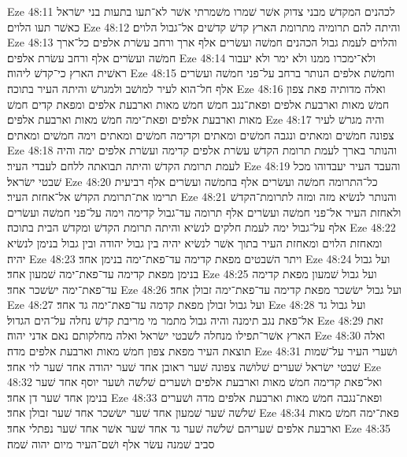 Eze 48:11  לכהנים המקדשׁ מבני צדוק אשׁר שׁמרו משׁמרתי אשׁר לא־תעו בתעות בני ישׂראל כאשׁר תעו הלוים׃
Eze 48:12  והיתה להם תרומיה מתרומת הארץ קדשׁ קדשׁים אל־גבול הלוים׃
Eze 48:13  והלוים לעמת גבול הכהנים חמשׁה ועשׂרים אלף ארך ורחב עשׂרת אלפים כל־ארך חמשׁה ועשׂרים אלף ורחב עשׂרת אלפים׃
Eze 48:14  ולא־ימכרו ממנו ולא ימר ולא יעבור ראשׁית הארץ כי־קדשׁ ליהוה׃
Eze 48:15  וחמשׁת אלפים הנותר ברחב על־פני חמשׁה ועשׂרים אלף חל־הוא לעיר למושׁב ולמגרשׁ והיתה העיר בתוכה׃
Eze 48:16  ואלה מדותיה פאת צפון חמשׁ מאות וארבעת אלפים ופאת־נגב חמשׁ חמשׁ מאות וארבעת אלפים ומפאת קדים חמשׁ מאות וארבעת אלפים ופאת־ימה חמשׁ מאות וארבעת אלפים׃
Eze 48:17  והיה מגרשׁ לעיר צפונה חמשׁים ומאתים ונגבה חמשׁים ומאתים וקדימה חמשׁים ומאתים וימה חמשׁים ומאתים׃
Eze 48:18  והנותר בארך לעמת תרומת הקדשׁ עשׂרת אלפים קדימה ועשׂרת אלפים ימה והיה לעמת תרומת הקדשׁ והיתה תבואתה ללחם לעבדי העיר׃
Eze 48:19  והעבד העיר יעבדוהו מכל שׁבטי ישׂראל׃
Eze 48:20  כל־התרומה חמשׁה ועשׂרים אלף בחמשׁה ועשׂרים אלף רביעית תרימו את־תרומת הקדשׁ אל־אחזת העיר׃
Eze 48:21  והנותר לנשׂיא מזה ומזה לתרומת־הקדשׁ ולאחזת העיר אל־פני חמשׁה ועשׂרים אלף תרומה עד־גבול קדימה וימה על־פני חמשׁה ועשׂרים אלף על־גבול ימה לעמת חלקים לנשׂיא והיתה תרומת הקדשׁ ומקדשׁ הבית בתוכה׃
Eze 48:22  ומאחזת הלוים ומאחזת העיר בתוך אשׁר לנשׂיא יהיה בין גבול יהודה ובין גבול בנימן לנשׂיא יהיה׃
Eze 48:23  ויתר השׁבטים מפאת קדימה עד־פאת־ימה בנימן אחד׃
Eze 48:24  ועל גבול בנימן מפאת קדימה עד־פאת־ימה שׁמעון אחד׃
Eze 48:25  ועל גבול שׁמעון מפאת קדימה עד־פאת־ימה ישׂשכר אחד׃
Eze 48:26  ועל גבול ישׂשכר מפאת קדימה עד־פאת־ימה זבולן אחד׃
Eze 48:27  ועל גבול זבולן מפאת קדמה עד־פאת־ימה גד אחד׃
Eze 48:28  ועל גבול גד אל־פאת נגב תימנה והיה גבול מתמר מי מריבת קדשׁ נחלה על־הים הגדול׃
Eze 48:29  זאת הארץ אשׁר־תפילו מנחלה לשׁבטי ישׂראל ואלה מחלקותם נאם אדני יהוה׃
Eze 48:30  ואלה תוצאת העיר מפאת צפון חמשׁ מאות וארבעת אלפים מדה׃
Eze 48:31  ושׁערי העיר על־שׁמות שׁבטי ישׂראל שׁערים שׁלושׁה צפונה שׁער ראובן אחד שׁער יהודה אחד שׁער לוי אחד׃
Eze 48:32  ואל־פאת קדימה חמשׁ מאות וארבעת אלפים ושׁערים שׁלשׁה ושׁער יוסף אחד שׁער בנימן אחד שׁער דן אחד׃
Eze 48:33  ופאת־נגבה חמשׁ מאות וארבעת אלפים מדה ושׁערים שׁלשׁה שׁער שׁמעון אחד שׁער ישׂשכר אחד שׁער זבולן אחד׃
Eze 48:34  פאת־ימה חמשׁ מאות וארבעת אלפים שׁעריהם שׁלשׁה שׁער גד אחד שׁער אשׁר אחד שׁער נפתלי אחד׃
Eze 48:35  סביב שׁמנה עשׂר אלף ושׁם־העיר מיום יהוה שׁמה׃


